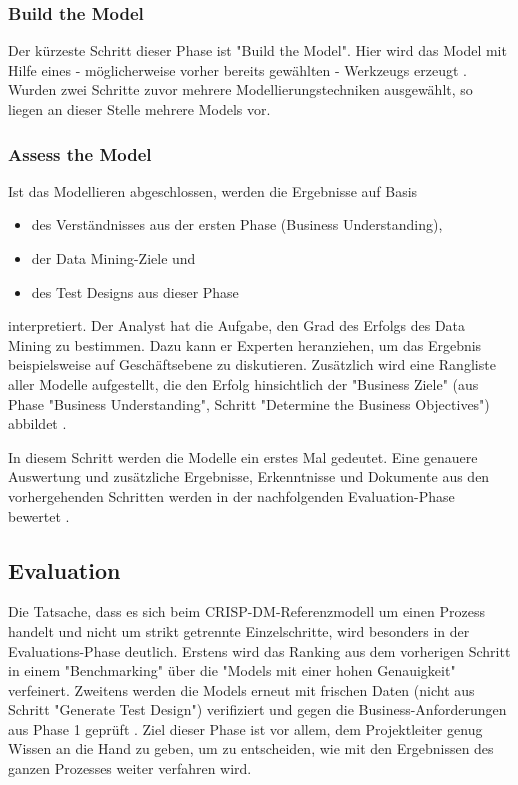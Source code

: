 \subsubsection{Build the Model}
Der kürzeste Schritt dieser Phase ist "Build the Model". Hier wird das Model mit Hilfe eines - möglicherweise vorher bereits gewählten - Werkzeugs erzeugt . Wurden zwei Schritte zuvor mehrere Modellierungstechniken ausgewählt, so liegen an dieser Stelle mehrere Models vor.

\subsubsection{Assess the Model}
Ist das Modellieren abgeschlossen, werden die Ergebnisse auf Basis 
\begin{itemize}
\item des Verständnisses aus der ersten Phase (Business Understanding),
\item der Data Mining-Ziele und
\item des Test Designs aus dieser Phase
\end{itemize}
interpretiert. Der Analyst hat die Aufgabe, den Grad des Erfolgs des Data Mining zu bestimmen. Dazu kann er Experten heranziehen, um das Ergebnis beispielsweise auf Geschäftsebene zu diskutieren. Zusätzlich wird eine Rangliste aller Modelle aufgestellt, die den Erfolg hinsichtlich der "Business Ziele" (aus Phase "Business Understanding", Schritt "Determine the Business Objectives") abbildet . \par
In diesem Schritt werden die Modelle ein erstes Mal gedeutet. Eine genauere Auswertung und zusätzliche Ergebnisse, Erkenntnisse und Dokumente aus den vorhergehenden Schritten werden in der nachfolgenden Evaluation-Phase bewertet \citep[S.25]{chapman_crisp-dm_2000}.


\subsection{Evaluation}
Die Tatsache, dass es sich beim CRISP-DM-Referenzmodell um einen Prozess handelt und nicht um strikt getrennte Einzelschritte, wird besonders in der Evaluations-Phase deutlich. Erstens wird das Ranking aus dem vorherigen Schritt in einem "Benchmarking" über die "Models mit einer hohen Genauigkeit" \citep[S.~73; eigene Übersetzung]{swamynathan_mastering_2017} verfeinert. Zweitens werden die Models erneut mit frischen Daten (nicht aus Schritt "Generate Test Design") verifiziert und gegen die Business-Anforderungen aus Phase 1 geprüft \citep[S.~73]{swamynathan_mastering_2017}. Ziel dieser Phase ist vor allem, dem Projektleiter genug Wissen an die Hand zu geben, um zu entscheiden, wie mit den Ergebnissen des ganzen Prozesses weiter verfahren wird. 

